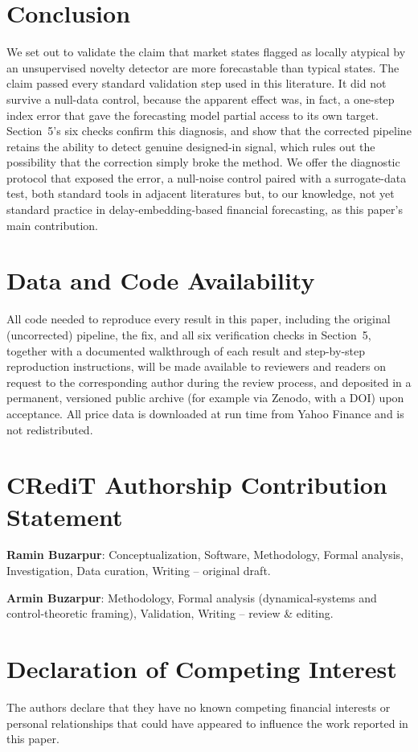 \documentclass[preprint,12pt]{elsarticle}
\begin{document}
\section{Conclusion}

We set out to validate the claim that market states flagged as locally atypical by an
unsupervised novelty detector are more forecastable than typical states. The claim passed
every standard validation step used in this literature. It did not survive a null-data
control, because the apparent effect was, in fact, a one-step index error that gave the
forecasting model partial access to its own target. Section~5's six checks confirm this
diagnosis, and show that the corrected pipeline retains the
ability to detect genuine designed-in signal, which rules out the possibility that the
correction simply broke the method. We offer the diagnostic protocol that exposed the error, a
null-noise control paired with a surrogate-data test, both standard tools in adjacent
literatures but, to our knowledge, not yet standard practice in delay-embedding-based financial
forecasting, as this paper's main contribution.

\newpage
\section*{Data and Code Availability}
All code needed to reproduce every result in this paper, including the original (uncorrected)
pipeline, the fix, and all six verification checks in Section~5, together with a documented
walkthrough of each result and step-by-step reproduction instructions, will be made available
to reviewers and readers on request to the corresponding author during the review process, and
deposited in a permanent, versioned public archive (for example via Zenodo, with a DOI) upon
acceptance. All price data is downloaded at run time from Yahoo Finance and is not
redistributed.

\section*{CRediT Authorship Contribution Statement}
\noindent\textbf{Ramin Buzarpur}: Conceptualization, Software, Methodology, Formal analysis,
Investigation, Data curation, Writing -- original draft.

\noindent\textbf{Armin Buzarpur}: Methodology, Formal analysis (dynamical-systems and
control-theoretic framing), Validation, Writing -- review \& editing.

\section*{Declaration of Competing Interest}
The authors declare that they have no known competing financial interests or personal
relationships that could have appeared to influence the work reported in this paper.
\end{document}
